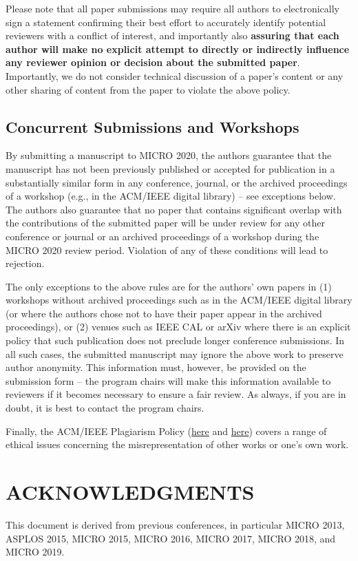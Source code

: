 \documentclass{sig-alternate}
\begin{document}
Please note that all paper submissions may require all authors to electronically sign a statement confirming their best effort to accurately identify potential reviewers with a conflict of interest, and importantly also {\bf assuring that each author will make no explicit attempt to directly or indirectly influence any reviewer opinion or decision about the submitted paper}. Importantly, we do not consider technical discussion of a paper's content or any other sharing of content from the paper to violate the above policy. 


\subsection{Concurrent Submissions and Workshops}

By submitting a manuscript to MICRO 2020, the authors guarantee that the manuscript has not been previously published or accepted for publication in a substantially similar form in any conference, journal, or the archived proceedings of a workshop (e.g., in the ACM/IEEE digital library) -- see exceptions below. The authors also guarantee that no paper that contains significant overlap with the contributions of the submitted paper will be under review for any other conference or journal or an archived proceedings of a workshop during the MICRO 2020 review period. Violation of any of these conditions will lead to rejection.

The only exceptions to the above rules are for the authors' own papers in (1) workshops without archived proceedings such as in the ACM/IEEE digital library (or where the authors chose not to have their paper appear in the archived proceedings), or (2) venues such as IEEE CAL or arXiv where there is an explicit policy that such publication does not preclude longer conference submissions.  In all such cases, the submitted manuscript may ignore the above work to preserve author anonymity. This information must, however, be provided on the submission form -- the program chairs will make this information available to reviewers if it becomes necessary to ensure a fair review.  As always, if you are in doubt, it is best to contact the program chairs.


Finally, the ACM/IEEE Plagiarism Policy (\href{http://www.acm.org/publications/policies/plagiarism_policy}{here} and \href{https://www.ieee.org/publications_standards/publications/rights/plagiarism_FAQ.html}{here}) covers a range of ethical issues concerning the misrepresentation of other works or one's own work.

\section*{ACKNOWLEDGMENTS}
This document is derived from previous conferences, in particular MICRO 2013, ASPLOS 2015, MICRO 2015, MICRO 2016, MICRO 2017, MICRO 2018, and MICRO 2019.






\end{document}
